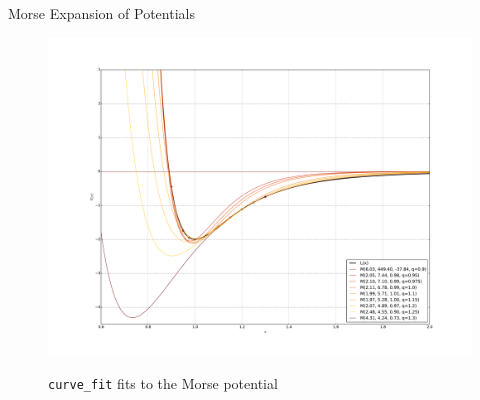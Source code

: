 \begin{chapter}{Morse Expansion of Potentials}
\begin{figure}[h!]
    \centering
\includegraphics[width=1.2\linewidth]{./figures/MorseFitsCurvefit/curvefitAll.pdf}
    \\
       \caption[\texttt{curve\_fit} fits to the Morse potential]{
	\texttt{curve\_fit} fits to the Morse potential
    \label{fig:MorseFitsCurvefit}
    }

\end{figure}




\end{chapter}
